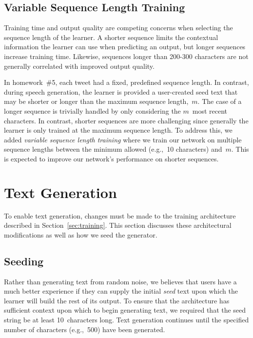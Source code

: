 \documentclass{article}
\begin{document}
\subsection{Variable Sequence Length Training}

Training time and output quality are competing concerns when selecting the sequence length of the learner.  A shorter sequence limits the contextual information the learner can use when predicting an output, but longer sequences increase training time.  Likewise, sequences longer than 200-300 characters are not generally correlated with improved output quality.

In homework~\#5, each tweet had a fixed, predefined sequence length.  In contrast, during speech generation, the learner is provided a user-created seed text that may be shorter or longer than the maximum sequence length,~$m$.  The case of a longer sequence is trivially handled by only considering the $m$~most recent characters.  In contrast, shorter sequences are more challenging since generally the learner is only trained at the maximum sequence length.  To address this, we added \textit{variable sequence length training} where we train our network on multiple sequence lengths between the minimum allowed (e.g.,~10 characters) and~$m$.  This is expected to improve our network's performance on shorter sequences.

\section{Text Generation}

To enable text generation, changes must be made to the training architecture described in Section~\ref{sec:training}.  This section discusses these architectural modifications as well as how we seed the generator.

\subsection{Seeding}

Rather than generating text from random noise, we believes that users have a much better experience if they can supply the initial \textit{seed} text upon which the learner will build the rest of its output.  To ensure that the architecture has sufficient context upon which to begin generating text, we required that the seed string be at least 10~characters long.  Text generation continues until the specified number of characters (e.g.,~500) have been generated.
\end{document}
